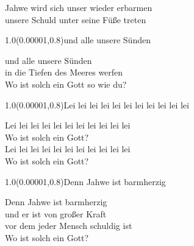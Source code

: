 \documentclass[aspectratio=169]{beamer}
\begin{document}
\begin{frame}
\centering
\color{white}
\huge{Jahwe wird sich unser wieder erbarmen} \\
\huge{unsere Schuld unter seine Füße treten} \\

\begin{textblock}{1.0}(0.00001,0.8)\color{gray}\normalsize{und alle unsere Sünden}\end{textblock}
\end{frame}

\begin{frame}
\centering
\color{white}
\huge{und alle unsere Sünden} \\
\huge{in die Tiefen des Meeres werfen} \\
\huge{Wo ist solch ein Gott so wie du?} \\

\begin{textblock}{1.0}(0.00001,0.8)\color{gray}\normalsize{Lei lei lei lei lei lei lei lei lei lei lei}\end{textblock}
\end{frame}

\begin{frame}
\centering
\color{white}
\huge{Lei lei lei lei lei lei lei lei lei lei lei} \\
\huge{Wo ist solch ein Gott?} \\
\huge{Lei lei lei lei lei lei lei lei lei lei lei} \\
\huge{Wo ist solch ein Gott?} \\

\begin{textblock}{1.0}(0.00001,0.8)\color{gray}\normalsize{Denn Jahwe ist barmherzig}\end{textblock}
\end{frame}

\begin{frame}
\centering
\color{white}
\huge{Denn Jahwe ist barmherzig} \\
\huge{und er ist von großer Kraft} \\
\huge{vor dem jeder Mensch schuldig ist} \\
\huge{Wo ist solch ein Gott?} \\
\end{frame}
\end{document}
